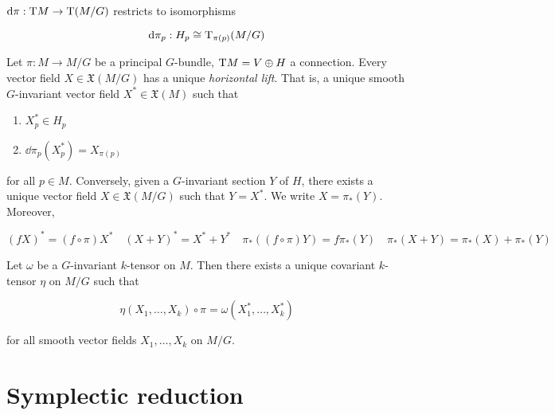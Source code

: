 \documentclass{article}
\newcommand{\red}{\mathrm{red}}
\begin{document}
\begin{lemma}
    \(\dd\pi : \mathrm{T} M \to \mathrm{T} (M/G)\) restricts to isomorphisms

    \[\dd\pi_p : H_p \cong \mathrm{T}_{\pi(p)}(M/G)\]
\end{lemma}

\begin{proposition}
     Let \(\pi : M \to M/G\) be a principal \(G\)-bundle, \(\mathrm{T} M = V \oplus H\) a connection. Every vector field \(X \in \mathfrak X(M/G)\) has a unique \emph{horizontal lift}. That is, a unique smooth \(G\)-invariant vector field \(X^* \in \mathfrak X(M)\) such that

    \begin{enumerate}
        \item \(X_p^* \in H_p\)
        \item \(\dd\pi_p(X_p^*) = X_{\pi(p)}\)
    \end{enumerate}

    for all \(p \in M\). Conversely, given a \(G\)-invariant section \(Y\) of \(H\), there exists a unique vector field \(X \in \mathfrak X(M/G)\) such that \(Y = X^*\). We write \(X = \pi_*(Y)\). Moreover,

    \[(fX)^* = (f \circ \pi)X^* \quad (X + Y)^* = X^* + Y^* \quad \pi_*((f \circ \pi)Y) = f\pi_*(Y)\quad \pi_*(X + Y) = \pi_*(X) + \pi_*(Y)\]
\end{proposition}

\begin{proposition}
    Let \(\omega\) be a \(G\)-invariant \(k\)-tensor on \(M\). Then there exists a unique covariant \(k\)-tensor \(\eta\) on \(M/G\) such that

    \[\eta(X_1, \dots, X_k) \circ \pi = \omega(X_1^*, \dots, X_k^*)\]

    for all smooth vector fields \(X_1, \dots, X_k\) on \(M/G\).
\end{proposition}

\section{Symplectic reduction}


\end{document}
